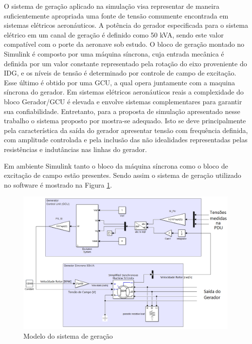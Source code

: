 O sistema de geração aplicado na simulação visa representar de maneira suficientemente apropriada uma fonte de tensão comumente encontrada em sistemas elétricos aeronáuticos. A potência do gerador especificada para o sistema elétrico em um canal de geração é definido como 50 kVA, sendo este valor compatível com o porte da aeronave sob estudo. O bloco de geração montado no Simulink é composto por uma máquina síncrona, cuja entrada mecânica é definida por um valor constante representado pela rotação do eixo proveniente do IDG, e os níveis de tensão é determinado por controle de campo de excitação. Esse último é obtido por uma GCU, a qual opera juntamente com a maquina síncrona do gerador. Em sistemas elétricos aeronáuticos reais a complexidade do bloco Gerador/GCU é elevada e envolve sistemas complementares para garantir sua confiabilidade. Entretanto, para a proposta de simulação apresentado nesse trabalho o sistema proposto por \cite{Olivier} mostra-se adequado. Isto se deve principalmente pela característica da saída do gerador apresentar tensão com frequência definida, com amplitude controlada e pela inclusão das não idealidades representadas pelas resistências e indutâncias nas linhas do gerador.

Em ambiente Simulink tanto o bloco da máquina síncrona como o bloco de excitação de campo estão presentes. Sendo assim o sistema de geração utilizado no software é mostrado na Figura \ref{fig:GEN_GCU.png}.

\begin{figure}[!htb] %
	\centering
	\includegraphics[width=0.99\textwidth]{Cap4/Figuras/GEN_GCU.png}
	\caption{Modelo do sistema de geração}
	\label{fig:GEN_GCU.png}
\end{figure}

